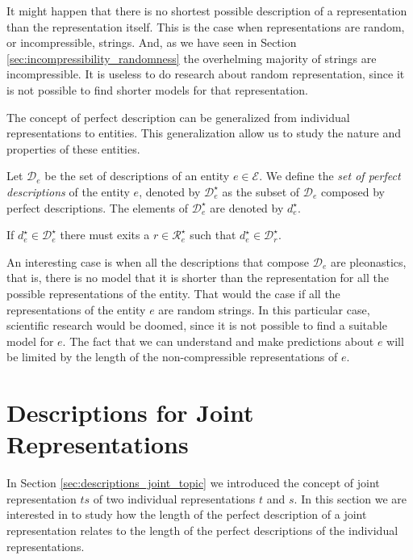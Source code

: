 It might happen that there is no shortest possible description of a representation than the representation itself. This is the case when representations are random, or incompressible, strings. And, as we have seen in Section \ref{sec:incompressibility_randomness} the overhelming majority of strings are incompressible. It is useless to do research about random representation, since it is not possible to find shorter models for that representation.

The concept of perfect description can be generalized from individual representations to entities. This generalization allow us to study the nature and properties of these entities.

\begin{definition}
\label{def:entities_perfect_model}
Let $\mathcal{D}_e$ be the set of descriptions of an entity $e \in \mathcal{E}$. We define the \emph{set of perfect descriptions} of the entity $e$, denoted by $\mathcal{D}^\star_e$ as the subset of $\mathcal{D}_e$ composed by perfect descriptions. The elements of $\mathcal{D}^\star_e$ are denoted by $d^\star_e$.
\end{definition}

If $d^\star_e \in \mathcal{D}^\star_e$ there must exits a $r \in \mathcal{R}^\star_e$ such that $d^\star_e \in \mathcal{D}^\star_r$.

An interesting case is when all the descriptions that compose $\mathcal{D}_e$ are pleonastics, that is, there is no model that it is shorter than the representation for all the possible representations of the entity. That would the case if all the representations of the entity $e$ are random strings. In this particular case, scientific research would be doomed, since it is not possible to find a suitable model for $e$. The fact that we can understand and make predictions about $e$ will be limited by the length of the non-compressible representations of $e$.


%
%

\section{Descriptions for Joint Representations}
\label{sec:description_joint_represenation}

In Section \ref{sec:descriptions_joint_topic} we introduced the concept of joint representation $ts$ of two individual representations $t$ and $s$. In this section we are interested in to study how the length of the perfect description of a joint representation relates to the length of the perfect descriptions of the individual representations.

